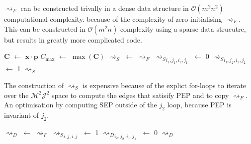 $\rightsquigarrow_F$ can be constructed trivally in a dense data structure in $\mathcal{O}(m^2n^2)$ computational complexity. because of the complexity of zero-initialising $\rightsquigarrow_F$. This can be constructed in $\mathcal{O}(m^2n)$ complexity using a sparse data strucutre, but results in greatly more complicated code.

\begin{algorithm}[h!]
	\begin{algorithmic}[1]
			\State $\mathbf{C}$ $\gets$ $\mathbf{x}\cdot\mathbf{p}$
			\State $C_{\max}$ $\gets$ $\max(\mathbf{C})$
			\State $\rightsquigarrow_S$ $\gets$ $\rightsquigarrow_F$
									\State ${\rightsquigarrow_S}_{i_1,j_1,i_2,j_1}$ $\gets$ 0
								\EndIf
										\State ${\rightsquigarrow_S}_{i_1,j_2,i_2,j_2}$ $\gets$ 1
									\EndIf
								\EndFor
							\EndFor
						\EndIf
					\EndFor
				\EndIf
			\EndFor
			\State \Return $\rightsquigarrow_S$
		\EndFunction
	\end{algorithmic}
\end{algorithm}

The construction of $\rightsquigarrow_S$ is expensive because of the explict for-loops to iterate over the $\mathcal{M}^2\mathcal{J}^2$ space to compute the edges that satisify PEP and to copy $\rightsquigarrow_F$. An optimisation by computing SEP outside of the $j_2$ loop, because PEP is invariant of $j_2$.

\begin{algorithm}[h!]
	\begin{algorithmic}[1]
			\State $\rightsquigarrow_D$ $\gets$ $\rightsquigarrow_F$
				\State ${\rightsquigarrow_S}_{i,j,i,j}$ $\gets$ 1
			\EndFor
						\State ${\rightsquigarrow_D}_{i_2,j_2,i_1,j_1}$ $\gets$ 0				
					\EndFor
				\EndFor
			\EndFor
			\State \Return $\rightsquigarrow_D$
		\EndFunction
	\end{algorithmic}
\end{algorithm}

